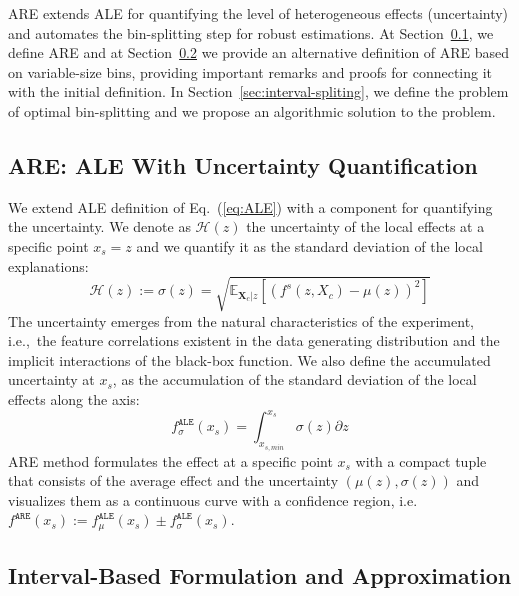 \documentclass[twoside]{article}
\newcommand{\dfdx}{f^s}
\newcommand{\Xcb}{\mathbf{X}_c}
\begin{document}
ARE extends ALE for quantifying the level of heterogeneous effects
(uncertainty) and automates the bin-splitting step for robust
estimations. At Section~\ref{sec:NAME-definition}, we define ARE and
at Section~\ref{sec:interval-based-estimation} we provide an
alternative definition of ARE based on variable-size bins, providing
important remarks and proofs for connecting it with the initial
definition. In Section~\ref{sec:interval-spliting}, we define the
problem of optimal bin-splitting and we propose an algorithmic
solution to the problem.

\subsection{ARE: ALE With Uncertainty Quantification}
\label{sec:NAME-definition}

We extend ALE definition of Eq.~(\ref{eq:ALE}) with a component for
quantifying the uncertainty. We denote as \(\mathcal{H}(z)\) the
uncertainty of the local effects at a specific point \(x_s=z\) and we
quantify it as the standard deviation of the local explanations:
\begin{equation}
  \label{eq:ALE_var}
  \mathcal{H}(z) := \sigma(z) = \sqrt{\mathbb{E}_{\Xcb|z}\left [ \left (\dfdx (z, X_c) - \mu(z) \right )^2 \right ] }
\end{equation}
\noindent
The uncertainty emerges from the natural characteristics of the
experiment, i.e.,~the feature correlations existent in the data
generating distribution and the implicit interactions of the black-box
function. We also define the accumulated uncertainty at \(x_s\), as
the accumulation of the standard deviation of the local effects along
the axis:
\begin{equation}
  \label{eq:ALE_acc_unc}
  f^{\mathtt{ALE}}_{\sigma}(x_s) = \int_{x_{s, min}}^{x_s} \sigma(z) \partial z
\end{equation}
\noindent
ARE method formulates the effect at a specific point \(x_s\) with a
compact tuple that consists of the average effect and the uncertainty
\((\mu(z), \sigma(z))\) and visualizes them as a continuous curve
with a confidence region, i.e.
\(f^{\mathtt{ARE}}(x_s) := f^{\mathtt{ALE}}_{\mu}(x_s) \pm
f^{\mathtt{ALE}}_{\sigma}(x_s)\). 

\subsection{Interval-Based Formulation and Approximation}
\label{sec:interval-based-estimation}
\end{document}
